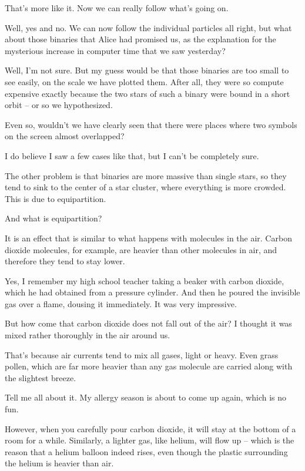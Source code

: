 \abc

\bob
That's more like it.  Now we can really follow what's going on.

\carol
Well, yes and no.  We can now follow the individual particles all right,
but what about those binaries that Alice had promised us, as the
explanation for the mysterious increase in computer time that we saw
yesterday?

\alice
Well, I'm not sure.  But my guess would be that those binaries are too
small to see easily, on the scale we have plotted them.  After all,
they were so compute expensive exactly because the two stars of such a
binary were bound in a short orbit -- or so we hypothesized.

\bob
Even so, wouldn't we have clearly seen that there were places where
two symbols on the screen almost overlapped?

\carol
I do believe I saw a few cases like that, but I can't be completely
sure.

\alice
The other problem is that binaries are more massive than single stars,
so they tend to sink to the center of a star cluster, where everything
is more crowded.  This is due to equipartition.

\bob
And what is equipartition?

\alice
It is an effect that is similar to what happens with molecules in the air.
Carbon dioxide molecules, for example, are heavier than other
molecules in air, and therefore they tend to stay lower.

\carol
Yes, I remember my high school teacher taking a beaker with carbon dioxide,
which he had obtained from a pressure cylinder.  And then he poured
the invisible gas over a flame, dousing it immediately.  It was very
impressive.

\bob
But how come that carbon dioxide does not fall out of the air?  I
thought it was mixed rather thoroughly in the air around us.

\alice
That's because air currents tend to mix all gases, light or heavy.
Even grass pollen, which are far more heavier than any gas molecule
are carried along with the slightest breeze.

\carol
Tell me all about it.  My allergy season is about to come up again,
which is no fun.

\alice
However, when you carefully pour carbon dioxide, it will stay at the
bottom of a room for a while.  Similarly, a lighter gas, like helium,
will flow up -- which is the reason that a helium balloon indeed rises,
even though the plastic surrounding the helium is heavier than air.

